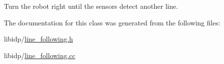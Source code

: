 Turn the robot right until the sensors detect another line. 



The documentation for this class was generated from the following files:\begin{DoxyCompactItemize}
\item 
libidp/\hyperlink{line__following_8h}{line\_\-following.h}\item 
libidp/\hyperlink{line__following_8cc}{line\_\-following.cc}\end{DoxyCompactItemize}
